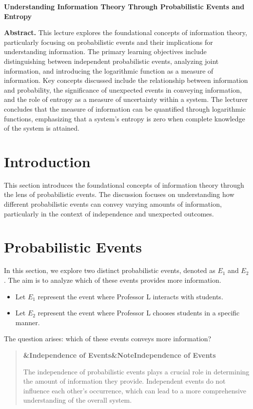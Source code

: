 \documentclass[a4paper]{article}
\newcommand{\boxheading}[1]{%
  \par\smallskip
  \noindent\textbf{\ifx&#1&Note\else#1\fi}\par
  \smallskip
}
\newenvironment{rembox}[1][]{%
  \begin{quote}\color{black!70}\boxheading{#1}\normalcolor
}{\end{quote}}
\begin{document}
\begin{center}
{\LARGE \textbf{Understanding Information Theory Through Probabilistic Events and Entropy}}\\[1em]
\end{center}

\textbf{Abstract.} This lecture explores the foundational concepts of information theory, particularly focusing on probabilistic events and their implications for understanding information. The primary learning objectives include distinguishing between independent probabilistic events, analyzing joint information, and introducing the logarithmic function as a measure of information. Key concepts discussed include the relationship between information and probability, the significance of unexpected events in conveying information, and the role of entropy as a measure of uncertainty within a system. The lecturer concludes that the measure of information can be quantified through logarithmic functions, emphasizing that a system's entropy is zero when complete knowledge of the system is attained.

\section{Introduction}
This section introduces the foundational concepts of information theory through the lens of probabilistic events. The discussion focuses on understanding how different probabilistic events can convey varying amounts of information, particularly in the context of independence and unexpected outcomes.

\section{Probabilistic Events}
In this section, we explore two distinct probabilistic events, denoted as \( E_1 \) and \( E_2 \). The aim is to analyze which of these events provides more information.

\begin{itemize}
    \item Let \( E_1 \) represent the event where Professor L interacts with students.
    \item Let \( E_2 \) represent the event where Professor L chooses students in a specific manner.
\end{itemize}

The question arises: which of these events conveys more information? 

\begin{rembox}[Independence of Events]
The independence of probabilistic events plays a crucial role in determining the amount of information they provide. Independent events do not influence each other's occurrence, which can lead to a more comprehensive understanding of the overall system.
\end{rembox}
\end{document}
